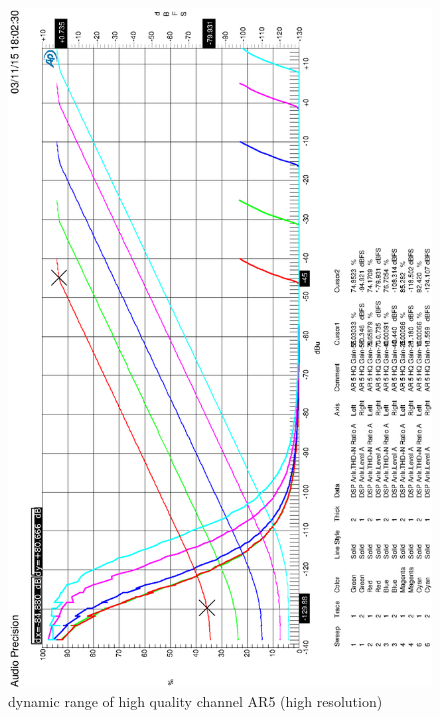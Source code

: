 \documentclass[11pt]{report}
\begin{document}
\begin{appendix}
\begin{figure}[htbp]
\begin{center}
\includegraphics[width=14cm,keepaspectratio=true]{HQTHDAR5HQdBVergleich}
\caption{dynamic range of high quality channel AR5 (high resolution)}
\label{Abb.:1}
\end{center}
\end{figure}









\end{appendix}


\nocite{mseifter88,pmandl97,weiss92,weiss92a,ginthoer93}

\newpage
\addtocounter{page}{1}
\addtocounter{page}{-1}





%
\end{document}
